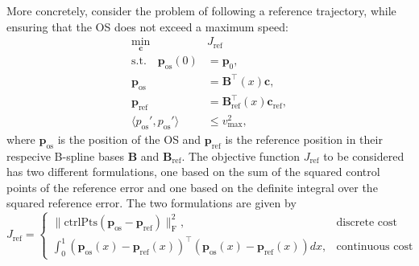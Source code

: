 More concretely, consider the problem of following a reference trajectory, while ensuring that the OS does not exceed a maximum speed:
\begin{equation}\label{eq:conservativeness-optimization}
    \begin{aligned}
        \min_{\mathbf c} \quad & J_\text{ref} \\
        \text{s.t.} \quad \mathbf p_\text{os}(0) &= \mathbf p_0, \\
                     \mathbf p_\text{os} &= \mathbf B^\top(x) \mathbf c, \\
                     \mathbf p_\text{ref} &= \mathbf B_\text{ref}^\top(x) \mathbf c_\text{ref}, \\
                     \langle p_\text{os}', p_\text{os}' \rangle &\le v_\text{max}^2,
    \end{aligned}
\end{equation}
where $\mathbf p_\text{os}$ is the position of the OS and $\mathbf p_\text{ref}$ is the reference position in their respecive B-spline bases $\mathbf B$ and $\mathbf B_\text{ref}$. The objective function $J_\text{ref}$ to be considered has two different formulations, one based on the sum of the squared control points of the reference error and one based on the definite integral over the squared reference error. The two formulations are given by
\begin{equation}\label{eq:conservativeness-objective}
    J_\text{ref} = \begin{cases}
        \|\text{ctrlPts}(\mathbf p_\text{os} - \mathbf p_\text{ref})\|_\text{F}^2, & \text{discrete cost} \\
        \int_0^1 \left(\mathbf p_\text{os}(x) - \mathbf p_\text{ref}(x)\right)^\top \left(\mathbf p_\text{os}(x) - \mathbf p_\text{ref}(x)\right) dx, & \text{continuous cost}
    \end{cases}
\end{equation}

